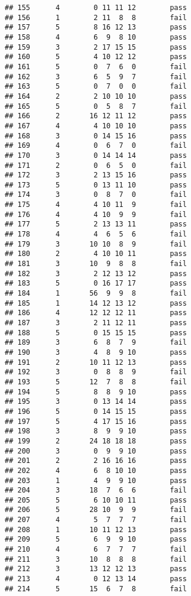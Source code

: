 \documentclass[
]{article}
\begin{document}
\begin{verbatim}
## 155      4        0 11 11 12        pass
## 156      1        2 11  8  8        fail
## 157      5        8 16 12 13        pass
## 158      4        6  9  8 10        pass
## 159      3        2 17 15 15        pass
## 160      5        4 10 12 12        pass
## 161      5        0  7  6  0        fail
## 162      3        6  5  9  7        fail
## 163      5        0  7  0  0        fail
## 164      2        2 10 10 10        pass
## 165      5        0  5  8  7        fail
## 166      2       16 12 11 12        pass
## 167      4        4 10 10 10        pass
## 168      3        0 14 15 16        pass
## 169      4        0  6  7  0        fail
## 170      3        0 14 14 14        pass
## 171      2        0  6  5  0        fail
## 172      3        2 13 15 16        pass
## 173      5        0 13 11 10        pass
## 174      3        0  8  7  0        fail
## 175      4        4 10 11  9        fail
## 176      4        4 10  9  9        fail
## 177      5        2 13 13 11        pass
## 178      4        4  6  5  6        fail
## 179      3       10 10  8  9        fail
## 180      2        4 10 10 11        pass
## 181      3       10  9  8  8        fail
## 182      3        2 12 13 12        pass
## 183      5        0 16 17 17        pass
## 184      1       56  9  9  8        fail
## 185      1       14 12 13 12        pass
## 186      4       12 12 12 11        pass
## 187      3        2 11 12 11        pass
## 188      5        0 15 15 15        pass
## 189      3        6  8  7  9        fail
## 190      3        4  8  9 10        pass
## 191      2       10 11 12 13        pass
## 192      3        0  8  8  9        fail
## 193      5       12  7  8  8        fail
## 194      5        8  8  9 10        pass
## 195      3        0 13 14 14        pass
## 196      5        0 14 15 15        pass
## 197      5        4 17 15 16        pass
## 198      3        8  9  9 10        pass
## 199      2       24 18 18 18        pass
## 200      3        0  9  9 10        pass
## 201      2        2 16 16 16        pass
## 202      4        6  8 10 10        pass
## 203      1        4  9  9 10        pass
## 204      3       18  7  6  6        fail
## 205      5        6 10 10 11        pass
## 206      5       28 10  9  9        fail
## 207      4        5  7  7  7        fail
## 208      1       10 11 12 13        pass
## 209      5        6  9  9 10        pass
## 210      4        6  7  7  7        fail
## 211      3       10  8  8  8        fail
## 212      3       13 12 12 13        pass
## 213      4        0 12 13 14        pass
## 214      5       15  6  7  8        fail

\end{verbatim}
\end{document}
